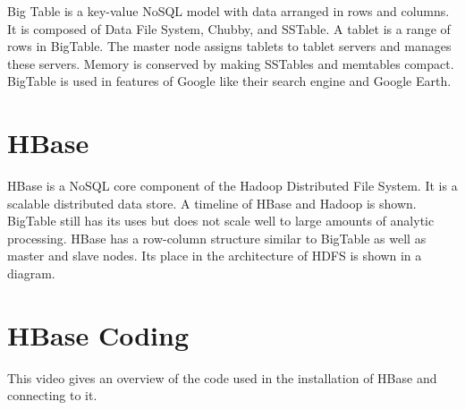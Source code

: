 Big Table is a key-value NoSQL model with data arranged in rows and
columns. It is composed of Data File System, Chubby, and SSTable. A
tablet is a range of rows in BigTable. The master node assigns tablets
to tablet servers and manages these servers. Memory is conserved by
making SSTables and memtables compact. BigTable is used in features of
Google like their search engine and Google Earth.




\section{HBase}

HBase is a NoSQL core component of the Hadoop Distributed File System.
It is a scalable distributed data store. A timeline of HBase and Hadoop
is shown. BigTable still has its uses but does not scale well to large
amounts of analytic processing. HBase has a row-column structure similar
to BigTable as well as master and slave nodes. Its place in the
architecture of HDFS is shown in a diagram.




\section{HBase Coding}

This video gives an overview of the code used in the installation of
HBase and connecting to it.




